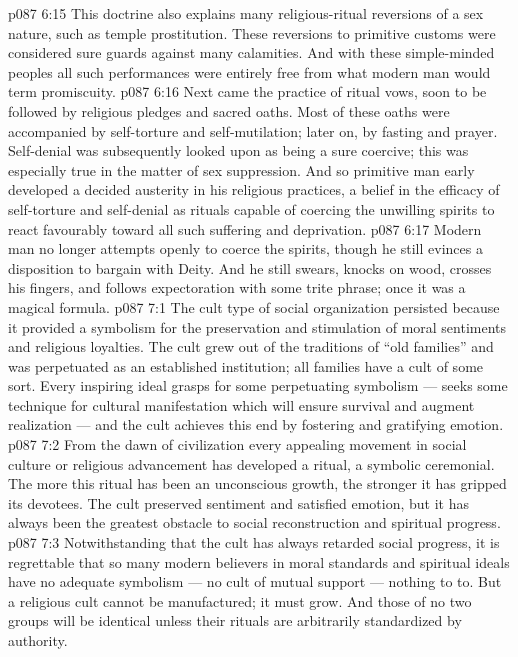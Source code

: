 \vs p087 6:15 This doctrine also explains many religious\hyp{}ritual reversions of a sex nature, such as temple prostitution. These reversions to primitive customs were considered sure guards against many calamities. And with these simple\hyp{}minded peoples all such performances were entirely free from what modern man would term promiscuity.
\vs p087 6:16 Next came the practice of ritual vows, soon to be followed by religious pledges and sacred oaths. Most of these oaths were accompanied by self\hyp{}torture and self\hyp{}mutilation; later on, by fasting and prayer. Self\hyp{}denial was subsequently looked upon as being a sure coercive; this was especially true in the matter of sex suppression. And so primitive man early developed a decided austerity in his religious practices, a belief in the efficacy of self\hyp{}torture and self\hyp{}denial as rituals capable of coercing the unwilling spirits to react favourably toward all such suffering and deprivation.
\vs p087 6:17 \pc Modern man no longer attempts openly to coerce the spirits, though he still evinces a disposition to bargain with Deity. And he still swears, knocks on wood, crosses his fingers, and follows expectoration with some trite phrase; once it was a magical formula.
\vs p087 7:1 The cult type of social organization persisted because it provided a symbolism for the preservation and stimulation of moral sentiments and religious loyalties. The cult grew out of the traditions of “old families” and was perpetuated as an established institution; all families have a cult of some sort. Every inspiring ideal grasps for some perpetuating symbolism --- seeks some technique for cultural manifestation which will ensure survival and augment realization --- and the cult achieves this end by fostering and gratifying emotion.
\vs p087 7:2 From the dawn of civilization every appealing movement in social culture or religious advancement has developed a ritual, a symbolic ceremonial. The more this ritual has been an unconscious growth, the stronger it has gripped its devotees. The cult preserved sentiment and satisfied emotion, but it has always been the greatest obstacle to social reconstruction and spiritual progress.
\vs p087 7:3 Notwithstanding that the cult has always retarded social progress, it is regrettable that so many modern believers in moral standards and spiritual ideals have no adequate symbolism --- no cult of mutual support --- nothing to  to. But a religious cult cannot be manufactured; it must grow. And those of no two groups will be identical unless their rituals are arbitrarily standardized by authority.
